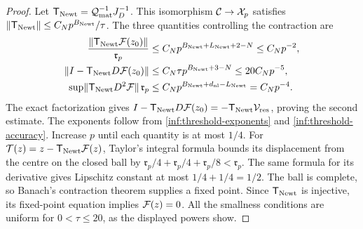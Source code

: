 \begin{proof}
Let $\mathsf T_{\mathrm{Newt}}=\mathcal Q_{\mathrm{mat}}^{-1}J_D^{-1}$. This isomorphism
$\mathcal C\to\mathcal X_p$ satisfies
$\lVert \mathsf T_{\mathrm{Newt}}\rVert\le C_Np^{B_{\mathrm{Newt}}}/\tau$.
The three quantities controlling the contraction are
\begin{align}
 \frac{\lVert \mathsf T_{\mathrm{Newt}}\mathcal F(z_0)\rVert}{\mathfrak r_p}
 &\le C_Np^{B_{\mathrm{Newt}}+L_{\mathrm{Newt}}+2-N}
                                      \le C_Np^{-2},
 \label{inf:newton-gate-one}\\
 \lVert I-\mathsf T_{\mathrm{Newt}} D\mathcal F(z_0)\rVert
 &\le C_N\tau p^{B_{\mathrm{Newt}}+3-N}\le20C_Np^{-5},
 \label{inf:newton-gate-two}\\
 \sup\lVert \mathsf T_{\mathrm{Newt}} D^2\mathcal F\rVert\,\mathfrak r_p
 &\le C_Np^{B_{\mathrm{Newt}}+d_{\mathrm{nl}}-L_{\mathrm{Newt}}}
                                      =C_Np^{-4}.
 \label{inf:newton-gate-three}
\end{align}
The exact factorization gives
$I-\mathsf T_{\mathrm{Newt}} D\mathcal F(z_0)=-\mathsf T_{\mathrm{Newt}}\mathcal V_{\mathrm{res}}$, proving
the second estimate. The exponents follow from
\eqref{inf:threshold-exponents} and \eqref{inf:threshold-accuracy}.
Increase $p$ until each quantity is at most $1/4$.
For $\mathcal T(z)=z-\mathsf T_{\mathrm{Newt}}\mathcal F(z)$, Taylor's integral formula
bounds its displacement from the centre on the closed ball by
$\mathfrak r_p/4+\mathfrak r_p/4+\mathfrak r_p/8<\mathfrak r_p$.
The same formula for its derivative gives Lipschitz constant at
most $1/4+1/4=1/2$.
The ball is complete, so Banach's contraction theorem supplies
a fixed point. Since $\mathsf T_{\mathrm{Newt}}$ is injective, its fixed-point equation
implies $\mathcal F(z)=0$. All the smallness conditions are uniform for
$0<\tau\le20$, as the displayed powers show.
\end{proof}

